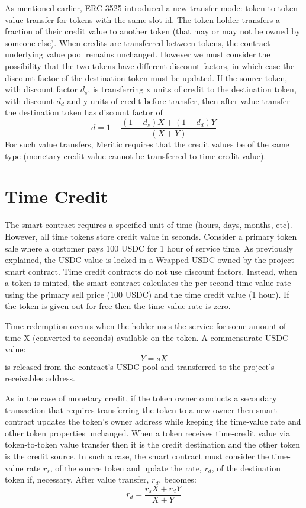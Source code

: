 \documentclass[twoside]{article}
\begin{document}
As mentioned earlier, ERC-3525 introduced a new transfer mode: token-to-token value transfer for tokens with the same slot id. The token holder transfers a fraction of their credit value to another token (that may or may not be owned by someone else). When credits are transferred between tokens, the contract underlying value pool remains unchanged. However we must consider  the possibility that the two tokens have different discount factors, in which case the discount factor of the destination token must be updated. If the source token, with discount factor $d_s$, is transferring x units of credit to the destination token, with discount $d_d$  and y units of credit before transfer, then after value transfer the destination token has discount factor of 
\begin{equation}
d = 1 - \frac{(1-d_s)X +(1 - d_d)Y}{(X + Y)}
\end{equation}
For such value transfers, Meritic requires that the credit values be of the same type (monetary credit value cannot be transferred to time credit value).  

\section{Time Credit}
The smart contract requires a specified unit of time (hours, days, months, etc). However, all time tokens store credit value in seconds. Consider a primary token sale where  a customer pays 100 USDC for 1 hour of service time. As previously explained, the USDC value is locked in a Wrapped USDC owned by the project smart contract. Time credit contracts do not use discount factors. Instead, when a token is minted, the smart contract calculates the per-second time-value rate using the  primary sell price (100 USDC) and the time credit value (1 hour). If the token is given out for free then the time-value rate is zero. 

Time redemption occurs when the holder uses the service for some amount of time X (converted to seconds)  available on the token. A commensurate USDC value:
\begin{equation}
Y = sX
\end{equation}
 is released  from the contract’s USDC pool and transferred to the project's receivables address. 

As in the case of monetary credit, if the token owner conducts a secondary transaction that requires transferring the token to a new owner then smart-contract updates the token’s owner address while keeping the time-value rate and other token properties unchanged.  
When a token receives time-credit value via token-to-token value transfer then it is the credit destination and the other token is the credit source. In such a case, the smart contract must consider  the time-value rate $r_s$, of the  source token and update the rate, $r_d$,  of the destination token if, necessary. After value transfer, $r_d$, becomes:
\begin{equation}
r_d = \frac{r_sX + r_d Y}{X + Y}
\end{equation}
\end{document}
